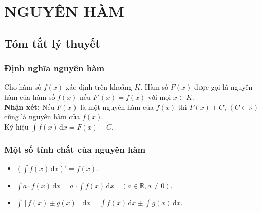 \def\tenchude{NGUYÊN HÀM}
\section{NGUYÊN HÀM}
\subsection{Tóm tắt lý thuyết}
\subsubsection{Định nghĩa nguyên hàm}
Cho hàm số $f(x)$ xác định trên khoảng $K$. Hàm số $F(x)$ được gọi là nguyên hàm của hàm số $f(x)$ nếu $F'(x)=f(x)$ với mọi $x\in K$.\\
\textbf{Nhận xét:} Nếu $F(x)$ là một nguyên hàm của $f(x)$ thì $F(x)+C$, $(C\in\mathbb{R})$ cũng là nguyên hàm của $f(x)$.\\
Ký hiệu $\displaystyle\int f(x)\mathrm{\,d}x=F(x)+C$.\\
\subsubsection{Một số tính chất của nguyên hàm}
\begin{itemize}
	\item $\left(\displaystyle\int f(x)\mathrm{\,d}x\right)'=f(x)$.
	\item $\displaystyle\int a\cdot f(x)\mathrm{\,d}x=a\cdot\displaystyle\int f(x)\mathrm{\,d}x\quad\left(a\in\mathbb{R}, a\neq 0\right)$.
	\item $\displaystyle\int\left[f(x)\pm g(x)\right]\mathrm{\,d}x=\displaystyle\int f(x)\mathrm{\,d}x\pm\displaystyle\int g(x)\mathrm{\,d}x$.
\end{itemize}
